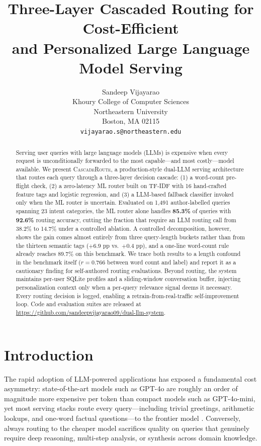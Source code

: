 \documentclass{article}
\title{Three-Layer Cascaded Routing for Cost-Efficient\\
and Personalized Large Language Model Serving}
\author{%
  Sandeep Vijayarao \\
  Khoury College of Computer Sciences \\
  Northeastern University \\
  Boston, MA 02115 \\
  \texttt{vijayarao.s@northeastern.edu}
}
\newcommand{\system}{\textsc{CascadeRoute}}
\newcommand{\smallmdl}{GPT-4o-mini}
\newcommand{\largemdl}{GPT-4o}
\begin{document}
\maketitle

\begin{abstract}
Serving user queries with large language models (LLMs) is expensive when every
request is unconditionally forwarded to the most capable---and most
costly---model available. We present \system{}, a production-style dual-LLM
serving architecture that routes each query through a three-layer decision
cascade: (1) a word-count pre-flight check, (2) a zero-latency ML router
built on TF-IDF with 16 hand-crafted feature tags and logistic regression,
and (3) a LLM-based fallback classifier invoked only when the ML router
is uncertain. Evaluated on 1,491 author-labelled queries spanning
23 intent categories, the ML router alone handles \textbf{85.3\%} of
queries with \textbf{92.6\%} routing accuracy, cutting the fraction that
require an LLM routing call from 38.2\% to 14.7\% under a controlled ablation.
A controlled decomposition, however, shows the gain comes almost entirely from
three query-length buckets rather than from the thirteen semantic tags
($+6.9$ pp vs.\ $+0.4$ pp), and a one-line word-count rule already reaches
89.7\% on this benchmark. We trace both results to a length confound in the
benchmark itself ($r = 0.766$ between word count and label) and report it as a
cautionary finding for self-authored routing evaluations. Beyond routing, the
system maintains per-user SQLite profiles and a sliding-window conversation
buffer, injecting personalization context only when a per-query relevance
signal deems it necessary. Every routing decision is logged, enabling a
retrain-from-real-traffic self-improvement loop. Code and evaluation suites
are released at \url{https://github.com/sandeepvijayarao09/dual-llm-system}.
\end{abstract}

\section{Introduction}
\label{sec:introduction}

The rapid adoption of LLM-powered applications has exposed a fundamental
cost asymmetry: state-of-the-art models such as \largemdl{} are roughly
an order of magnitude more expensive per token than compact models such as
\smallmdl{}, yet most serving stacks route every query---including trivial
greetings, arithmetic lookups, and one-word factual questions---to the
frontier model \citep{chen2023frugalgpt}. Conversely, always routing to
the cheaper model sacrifices quality on queries that genuinely require deep
reasoning, multi-step analysis, or synthesis across domain knowledge.
\end{document}
